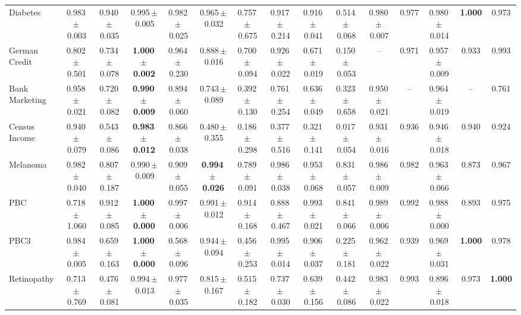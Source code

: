 \documentclass[8pt]{extarticle}
\begin{document}
\begin{longtable}{l*{14}{c}}
Diabetes & 0.983\,$\pm$\,0.003 & 0.940\,$\pm$\,0.035 & 0.995\,$\pm$\,0.005 & 0.982\,$\pm$\,0.025 & 0.965\,$\pm$\,0.032 & 0.757\,$\pm$\,0.675 & 0.917\,$\pm$\,0.214 & 0.916\,$\pm$\,0.041 & 0.514\,$\pm$\,0.068 & 0.980\,$\pm$\,0.007 & 0.977 & 0.980\,$\pm$\,0.014 & \textbf{1.000} & 0.973 \\
German Credit & 0.802\,$\pm$\,0.501 & 0.734\,$\pm$\,0.078 & \textbf{1.000\,$\pm$\,0.002} & 0.964\,$\pm$\,0.230 & 0.888\,$\pm$\,0.016 & 0.700\,$\pm$\,0.094 & 0.926\,$\pm$\,0.022 & 0.671\,$\pm$\,0.019 & 0.150\,$\pm$\,0.053 & -- & 0.971 & 0.957\,$\pm$\,0.009 & 0.933 & 0.993 \\
Bank Marketing & 0.958\,$\pm$\,0.021 & 0.720\,$\pm$\,0.082 & \textbf{0.990\,$\pm$\,0.009} & 0.894\,$\pm$\,0.060 & 0.743\,$\pm$\,0.089 & 0.392\,$\pm$\,0.130 & 0.761\,$\pm$\,0.254 & 0.636\,$\pm$\,0.049 & 0.323\,$\pm$\,0.658 & 0.950\,$\pm$\,0.021 & -- & 0.964\,$\pm$\,0.019 & -- & 0.761 \\
Census Income & 0.940\,$\pm$\,0.079 & 0.543\,$\pm$\,0.086 & \textbf{0.983\,$\pm$\,0.012} & 0.866\,$\pm$\,0.038 & 0.480\,$\pm$\,0.355 & 0.186\,$\pm$\,0.298 & 0.377\,$\pm$\,0.516 & 0.321\,$\pm$\,0.141 & 0.017\,$\pm$\,0.054 & 0.931\,$\pm$\,0.016 & 0.936 & 0.946\,$\pm$\,0.018 & 0.940 & 0.924 \\
Melanoma & 0.982\,$\pm$\,0.040 & 0.807\,$\pm$\,0.187 & 0.990\,$\pm$\,0.009 & 0.909\,$\pm$\,0.055 & \textbf{0.994\,$\pm$\,0.026} & 0.789\,$\pm$\,0.091 & 0.986\,$\pm$\,0.038 & 0.953\,$\pm$\,0.068 & 0.831\,$\pm$\,0.057 & 0.986\,$\pm$\,0.009 & 0.982 & 0.963\,$\pm$\,0.066 & 0.873 & 0.967 \\
PBC & 0.718\,$\pm$\,1.060 & 0.912\,$\pm$\,0.085 & \textbf{1.000\,$\pm$\,0.000} & 0.997\,$\pm$\,0.006 & 0.991\,$\pm$\,0.012 & 0.914\,$\pm$\,0.168 & 0.888\,$\pm$\,0.467 & 0.993\,$\pm$\,0.021 & 0.841\,$\pm$\,0.066 & 0.989\,$\pm$\,0.006 & 0.992 & 0.988\,$\pm$\,0.000 & 0.893 & 0.975 \\
PBC3 & 0.984\,$\pm$\,0.005 & 0.659\,$\pm$\,0.163 & \textbf{1.000\,$\pm$\,0.000} & 0.568\,$\pm$\,0.096 & 0.944\,$\pm$\,0.094 & 0.456\,$\pm$\,0.253 & 0.995\,$\pm$\,0.014 & 0.906\,$\pm$\,0.037 & 0.225\,$\pm$\,0.181 & 0.962\,$\pm$\,0.022 & 0.939 & 0.969\,$\pm$\,0.031 & \textbf{1.000} & 0.978 \\
Retinopathy & 0.713\,$\pm$\,0.769 & 0.476\,$\pm$\,0.081 & 0.994\,$\pm$\,0.013 & 0.977\,$\pm$\,0.035 & 0.815\,$\pm$\,0.167 & 0.515\,$\pm$\,0.182 & 0.737\,$\pm$\,0.030 & 0.639\,$\pm$\,0.156 & 0.442\,$\pm$\,0.086 & 0.983\,$\pm$\,0.022 & 0.993 & 0.896\,$\pm$\,0.018 & 0.973 & \textbf{1.000} \\

\end{longtable}
\end{document}
